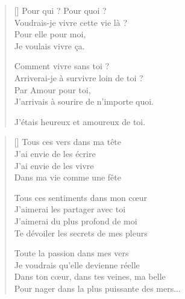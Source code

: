 
\settowidth{\versewidth}{J'arrivais à sourire de n'importe quoi.}
\begin{verse}[\versewidth]
Pour qui ? Pour quoi ? \\
Voudrais-je vivre cette vie là ? \\
Pour elle pour moi, \\
Je voulais vivre ça.

Comment vivre sans toi ? \\
Arriverai-je à survivre loin de toi ? \\
Par Amour pour toi, \\
J'arrivais à sourire de n'importe quoi.

\vin J'étais heureux et amoureux de toi.
\end{verse}

\newpage

\settowidth{\versewidth}{Pour nager avec toi dans la plus puissante des mers...}
\begin{verse}[\versewidth]
Tous ces vers dans ma tête \\
J'ai envie de les écrire \\
J'ai envie de les vivre \\
Dans ma vie comme une fête

Tous ces sentiments dans mon cœur \\
J'aimerai les partager avec toi \\
J'aimerai du plus profond de moi \\
Te dévoiler les secrets de mes pleurs

Toute la passion dans mes vers \\
Je voudrais qu'elle devienne réelle \\
Dans ton cœur, dans tes veines, ma belle \\
Pour nager dans la plus puissante des mers...
\end{verse}

\newpage

